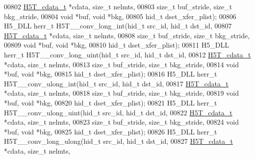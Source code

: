 \begin{DoxyCode}
00802                      \hyperlink{struct_h5_t__cdata__t}{H5T\_cdata\_t} *cdata, \textcolor{keywordtype}{size\_t} nelmts,
00803                      \textcolor{keywordtype}{size\_t} buf\_stride, \textcolor{keywordtype}{size\_t} bkg\_stride,
00804                                      \textcolor{keywordtype}{void} *buf, \textcolor{keywordtype}{void} *bkg,
00805                                      hid\_t dset\_xfer\_plist);
00806 H5\_DLL herr\_t H5T\_\_conv\_long\_int(hid\_t src\_id, hid\_t dst\_id,
00807                  \hyperlink{struct_h5_t__cdata__t}{H5T\_cdata\_t} *cdata, \textcolor{keywordtype}{size\_t} nelmts,
00808                  \textcolor{keywordtype}{size\_t} buf\_stride, \textcolor{keywordtype}{size\_t} bkg\_stride,
00809                                  \textcolor{keywordtype}{void} *buf, \textcolor{keywordtype}{void} *bkg,
00810                                  hid\_t dset\_xfer\_plist);
00811 H5\_DLL herr\_t H5T\_\_conv\_long\_uint(hid\_t src\_id, hid\_t dst\_id,
00812                   \hyperlink{struct_h5_t__cdata__t}{H5T\_cdata\_t} *cdata, \textcolor{keywordtype}{size\_t} nelmts,
00813                   \textcolor{keywordtype}{size\_t} buf\_stride, \textcolor{keywordtype}{size\_t} bkg\_stride,
00814                                   \textcolor{keywordtype}{void} *buf, \textcolor{keywordtype}{void} *bkg,
00815                                   hid\_t dset\_xfer\_plist);
00816 H5\_DLL herr\_t H5T\_\_conv\_ulong\_int(hid\_t src\_id, hid\_t dst\_id,
00817                   \hyperlink{struct_h5_t__cdata__t}{H5T\_cdata\_t} *cdata, \textcolor{keywordtype}{size\_t} nelmts,
00818                   \textcolor{keywordtype}{size\_t} buf\_stride, \textcolor{keywordtype}{size\_t} bkg\_stride,
00819                                   \textcolor{keywordtype}{void} *buf, \textcolor{keywordtype}{void} *bkg,
00820                                   hid\_t dset\_xfer\_plist);
00821 H5\_DLL herr\_t H5T\_\_conv\_ulong\_uint(hid\_t src\_id, hid\_t dst\_id,
00822                    \hyperlink{struct_h5_t__cdata__t}{H5T\_cdata\_t} *cdata, \textcolor{keywordtype}{size\_t} nelmts,
00823                    \textcolor{keywordtype}{size\_t} buf\_stride, \textcolor{keywordtype}{size\_t} bkg\_stride,
00824                                    \textcolor{keywordtype}{void} *buf, \textcolor{keywordtype}{void} *bkg,
00825                                    hid\_t dset\_xfer\_plist);
00826 H5\_DLL herr\_t H5T\_\_conv\_long\_ulong(hid\_t src\_id, hid\_t dst\_id,
00827                    \hyperlink{struct_h5_t__cdata__t}{H5T\_cdata\_t} *cdata, \textcolor{keywordtype}{size\_t} nelmts,

\end{DoxyCode}
